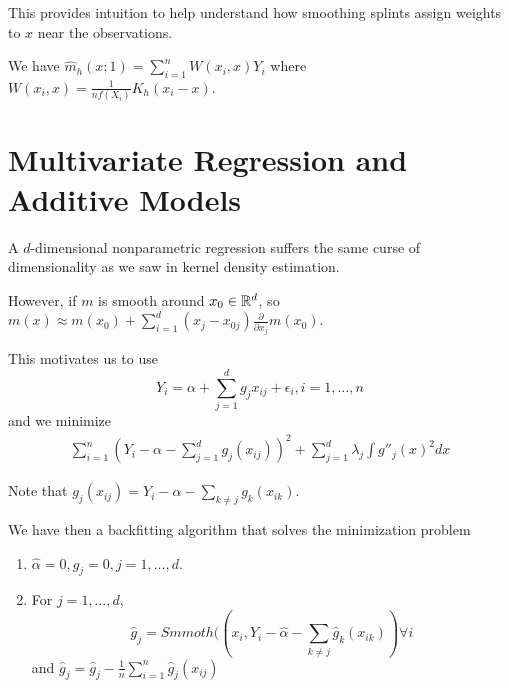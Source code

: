 This provides intuition to help understand how smoothing splints
assign weights to $x$ near the observations.

We have $\hat m_{h}(x; 1) = \sum_{i=1}^{n} W(x_{i}, x) Y_{i}$ where
$W(x_{i}, x) = \frac{1}{nf(X_{i})} K_{h}(x_{i} - x)$.

\section{Multivariate Regression and Additive Models}
\label{sec:mult-regr-addit}

A $d$-dimensional nonparametric regression suffers the same curse of
dimensionality as we saw in kernel density estimation.

However, if $m$ is smooth around $x_{0} \in \mathbb{R}^{d}$, so $m(x) \approx
m(x_{0}) + \sum_{i=1}^{d} (x_{j} - x_{0j}) \frac{\partial}{\partial
  x_{j}} m(x_{0})$.

This motivates us to use
\begin{equation}
  \label{eq:89}
  Y_{i} = \alpha + \sum_{j=1}^{d} g_{j} x_{ij} + \epsilon_{i}, i = 1,
  \dots, n
\end{equation} and we minimize
\begin{align}
  \label{eq:91}
  \sum_{i=1}^{n} (Y_{i} - \alpha - \sum_{j=1}^{d} g_{j}(x_{ij}))^{2} +
  \sum_{j=1}^{d} \lambda_{j} \int g''_{j}(x)^{2} dx
\end{align}

Note that $g_{j}(x_{ij}) = Y_i - \alpha - \sum_{k \neq j}^{}
g_{k}(x_{ik})$.

We have then a backfitting algorithm that solves the minimization problem
\begin{enumerate}
\item $\hat \alpha = 0, \hat g_{j} = 0, j = 1, \dots, d$.
\item For $j = 1, \dots, d$,
  \begin{equation}
    \label{eq:92}
    \hat g_{j} = Smmoth ((x_{i}, Y_{i} - \hat \alpha  - \sum_{k \neq
      j}^{} \hat g_{k}(x_{ik})) \forall i
  \end{equation}
  and $\hat g_{j} = \hat g_{j} - \frac{1}{n} \sum_{i=1}^{n} \hat g_{j}(x_{ij})$
\end{enumerate}


